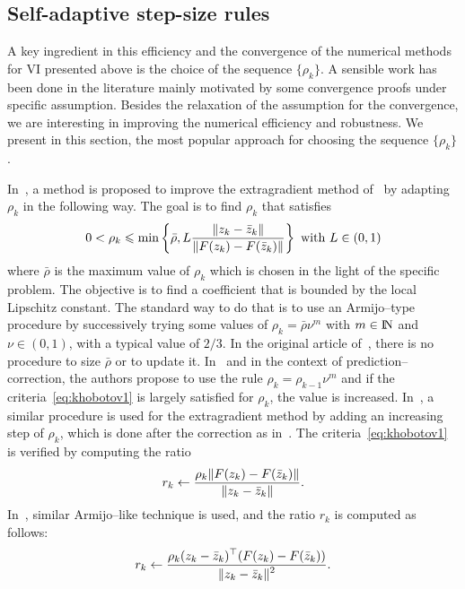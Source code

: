 {\subsection{Self-adaptive step-size rules}
\label{sec:numericalmethods,vi,adaptive}

A key ingredient in this efficiency and the convergence of the numerical methods for VI presented above is the choice of the sequence $\{\rho_k\}$. A sensible work has been done in the literature mainly motivated by some convergence proofs under specific assumption. Besides the relaxation of the assumption for the convergence, we are interesting in improving the numerical efficiency and robustness. We present in this section, the most popular approach for choosing the sequence $\{\rho_k\}$.

In~\citep{Khobotov_CMMP1987}, a method is proposed to improve the extragradient method of~\citet{Korpelevich1976} by adapting $\rho_k$ in the following way.
The goal is to  find $\rho_k$ that satisfies
  \begin{equation}
    \label{eq:khobotov1}
    0 < \rho_k \leq \min\left\{\bar\rho,L \Frac{\|z_k-\bar z_k\|}{\|F(z_k)-F(\bar z_k)\|}\right\}\text{ with } L \in (0,1)
  \end{equation}
where $\bar \rho$ is the maximum value of $\rho_k$ which is chosen in the light of the specific problem.
The {objective} is to find a coefficient that is bounded by the local Lipschitz constant. The standard way to do that is to use an Armijo--type procedure by successively trying some values of $\rho_k = \bar \rho \nu^m$ with $m\in\mathrm{I\!N}$ and $\nu\in (0,1)$, with a typical value of $2/3$.  In the original article of~\cite{Khobotov_CMMP1987}, there is no procedure to size $\bar \rho$ or to update it. In~\cite{He.Liao_JOTA2002} and in the context of prediction--correction, the authors propose to use the rule $\rho_k =  \rho_{k-1} \nu^m$ and  if the criteria~\eqref{eq:khobotov1} is largely satisfied for $\rho_{k}$, the value is increased.
In~\citep{Han.Lo_CMA2002},  a similar procedure is used for the extragradient method by adding an increasing step of $\rho_k$, which is done after the correction as in~\cite{He.Liao_JOTA2002}. The criteria~\eqref{eq:khobotov1} is  verified by computing the ratio
\begin{equation}
  \label{eq:Khobotov-r}
  r _{k} \leftarrow \Frac{\rho_k \|F(z_k)-F(\bar z_k)\|}{ \|z_k-\bar z_k\| }.
\end{equation}
 In~\citep{Solodov.Tseng1996}, similar Armijo--like technique is used, and the ratio $r_k$ is computed as follows:
\begin{equation}
  \label{eq:SolodovTseng-r}
  r _{k} \leftarrow \Frac{\rho_k(z_k-\bar z_k)^\top(F(z_k)-F(\bar z_k))}{ \|z_k-\bar z_k\|^2 }.
\end{equation}




}
